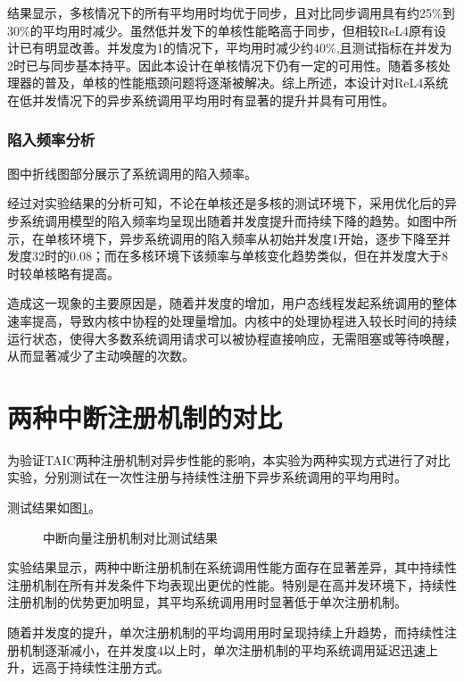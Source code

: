 结果显示，多核情况下的所有平均用时均优于同步，且对比同步调用具有约25\%到30\%的平均用时减少。虽然低并发下的单核性能略高于同步，但相较ReL4原有设计已有明显改善。并发度为1的情况下，平均用时减少约40\%,且测试指标在并发为2时已与同步基本持平。因此本设计在单核情况下仍有一定的可用性。随着多核处理器的普及，单核的性能瓶颈问题将逐渐被解决。综上所述，本设计对ReL4系统在低并发情况下的异步系统调用平均用时有显著的提升并具有可用性。

\subsubsection{陷入频率分析}

图中折线图部分展示了系统调用的陷入频率。

经过对实验结果的分析可知，不论在单核还是多核的测试环境下，采用优化后的异步系统调用模型的陷入频率均呈现出随着并发度提升而持续下降的趋势。如图中所示，在单核环境下，异步系统调用的陷入频率从初始并发度1开始，逐步下降至并发度32时的0.08；而在多核环境下该频率与单核变化趋势类似，但在并发度大于8时较单核略有提高。

造成这一现象的主要原因是，随着并发度的增加，用户态线程发起系统调用的整体速率提高，导致内核中协程的处理量增加。内核中的处理协程进入较长时间的持续运行状态，使得大多数系统调用请求可以被协程直接响应，无需阻塞或等待唤醒，从而显著减少了主动唤醒的次数。

\section{两种中断注册机制的对比}\label{sec:regintctest}

为验证TAIC两种注册机制对异步性能的影响，本实验为两种实现方式进行了对比实验，分别测试在一次性注册与持续性注册下异步系统调用的平均用时。

测试结果如图\ref{中断向量注册机制对比测试结果}。

\begin{figure}[htbp]
  \centering
  
  \caption{中断向量注册机制对比测试结果}\label{中断向量注册机制对比测试结果}
\end{figure}

实验结果显示，两种中断注册机制在系统调用性能方面存在显著差异，其中持续性注册机制在所有并发条件下均表现出更优的性能。特别是在高并发环境下，持续性注册机制的优势更加明显，其平均系统调用用时显著低于单次注册机制。

随着并发度的提升，单次注册机制的平均调用用时呈现持续上升趋势，而持续性注册机制逐渐减小，在并发度4以上时，单次注册机制的平均系统调用延迟迅速上升，远高于持续性注册方式。

